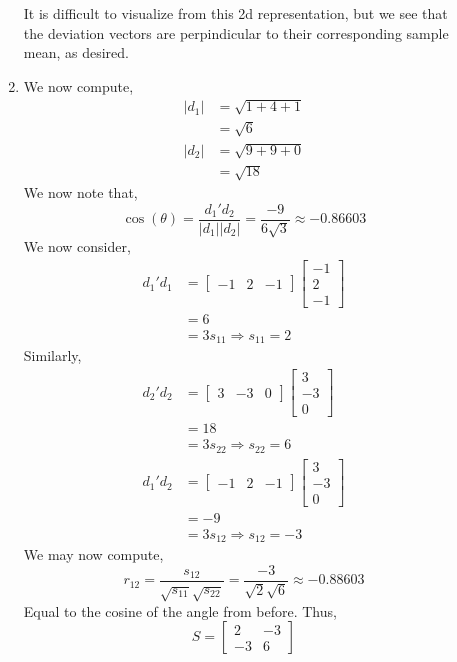 \documentclass[letterpaper,10pt]{article}
\begin{document}
\begin{description}
\begin{enumerate}[label=\alph*.]
\begin{center}
\end{center}
It is difficult to visualize from this 2d representation, but we see that the deviation vectors are perpindicular to their corresponding sample mean, as desired.
\item We now compute,
\begin{align*}
|d_1| &= \sqrt{1+4+1}\\
&= \sqrt{6}\\
|d_2| &= \sqrt{9+9+0}\\
&=\sqrt{18}
\end{align*}
We now note that, 
\[\cos(\theta)=\frac{d_1'd_2}{|d_1||d_2|}=\frac{-9}{6\sqrt{3}}\approx-0.86603\]
We now consider,
\begin{align*}
d_1'd_1 &=\begin{bmatrix}
-1 & 2 & -1
\end{bmatrix}\begin{bmatrix}
-1 \\ 2 \\-1
\end{bmatrix}\\
&=6\\
&=3s_{11}\Rightarrow s_{11}=2
\end{align*}
Similarly,
\begin{align*}
d_2'd_2 &= \begin{bmatrix}
3 & -3 & 0
\end{bmatrix}\begin{bmatrix}
3\\-3\\0
\end{bmatrix}\\
&=18\\
&=3s_{22}\Rightarrow s_{22}=6\\
d_1'd_2 &= \begin{bmatrix}
-1 & 2 & -1
\end{bmatrix}\begin{bmatrix}
3\\-3\\0
\end{bmatrix}\\
&=-9\\
&=3s_{12}\Rightarrow s_{12}=-3
\end{align*}
We may now compute,
\[r_{12}=\frac{s_{12}}{\sqrt{s_{11}}\sqrt{s_{22}}}=\frac{-3}{\sqrt{2}\sqrt{6}}\approx -0.88603\]
Equal to the cosine of the angle from before. Thus,
\[S=\begin{bmatrix}
2 & -3\\
-3 & 6

\end{bmatrix}\]
\end{enumerate}
\end{description}
\end{document}
